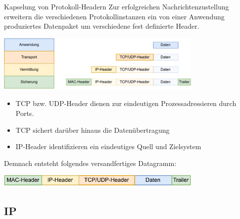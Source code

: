 \begin{defi}{Kapselung von Protokoll-Headern}
    Zur erfolgreichen Nachrichtenzustellung erweitern die verschiedenen Protokollinstanzen ein von einer Anwendung produziertes Datenpaket um verschiedene fest definierte Header.
    
    \begin{center}
        \includegraphics[width=0.75\textwidth]{includes/figures/defi_header_kapselung.pdf}
    \end{center}
    
    \begin{itemize}
        \item TCP bzw. UDP-Header dienen zur eindeutigen Prozessadressieren durch Ports.
        \item TCP sichert darüber hinaus die Datenübertragung
        \item IP-Header identifizieren ein eindeutiges Quell und Zielsystem
    \end{itemize}
    
    Demnach entsteht folgendes versandfertiges Datagramm:
    
    \begin{center}
        \includegraphics[width=0.75\textwidth]{includes/figures/defi_datagramm.pdf}
    \end{center}
\end{defi}

\subsection{IP}

